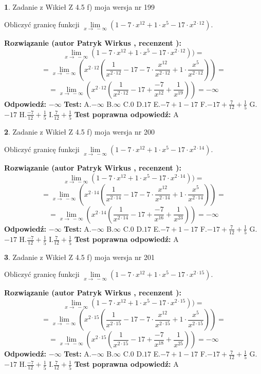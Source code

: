 \documentclass[12pt, a4paper]{article}
\theoremstyle{definition} %
\newtheorem{zad}{}
\newcommand{\zadStart}[1]{\begin{zad}#1\newline}
\newcommand{\zadStop}{\end{zad}}
\newcommand{\rozwStart}[2]{\noindent \textbf{Rozwiązanie (autor #1 , recenzent #2): }\newline}
\newcommand{\rozwStop}{\newline}
\newcommand{\odpStart}{\noindent \textbf{Odpowiedź:}\newline}
\newcommand{\odpStop}{\newline}
\newcommand{\testStart}{\noindent \textbf{Test:}\newline}
\newcommand{\testStop}{\newline}
\newcommand{\kluczStart}{\noindent \textbf{Test poprawna odpowiedź:}\newline}
\newcommand{\kluczStop}{\newline}
\begin{document}
\zadStart{Zadanie z Wikieł Z 4.5 f) moja wersja nr 199}



Obliczyć granicę funkcji  $\lim\limits_{x\to\ -\infty}(1 - 7 \cdot x^{12}+1 \cdot x^{5}- 17 \cdot x^{2\cdot12})$.
\zadStop
\rozwStart{Patryk Wirkus}{}
$$\lim\limits_{x\to\ -\infty}(1 - 7 \cdot x^{12}+1 \cdot x^{5}- 17 \cdot x^{2\cdot12}))=$$
$$=\lim\limits_{x\to\ -\infty}(x^{2\cdot12}(\frac{1}{x^{2\cdot12}}-17 -7 \cdot \frac{x^{12}}{x^{2\cdot12}}+1 \cdot \frac{x^{5}}{x^{2\cdot12}}))=$$
$$=\lim\limits_{x\to\ -\infty}(x^{2\cdot12}(\frac{1}{x^{2\cdot12}}-17 + \frac{-7}{x^{12}}+ \frac{1}{x^{19}}))=-\infty$$
\rozwStop
\odpStart
$-\infty$
\odpStop
\testStart
A.$-\infty$ B.$\infty$ C.$0$ D.$17$ E.$-7 + 1 - 17$
F.$-17+\frac{7}{12}+\frac{1}{5}$ G.$-17$
H.$\frac{-7}{12}+\frac{1}{5}$
I.$\frac{7}{12}+\frac{1}{5}$
\testStop
\kluczStart
A
\kluczStop



\zadStart{Zadanie z Wikieł Z 4.5 f) moja wersja nr 200}



Obliczyć granicę funkcji  $\lim\limits_{x\to\ -\infty}(1 - 7 \cdot x^{12}+1 \cdot x^{5}- 17 \cdot x^{2\cdot14})$.
\zadStop
\rozwStart{Patryk Wirkus}{}
$$\lim\limits_{x\to\ -\infty}(1 - 7 \cdot x^{12}+1 \cdot x^{5}- 17 \cdot x^{2\cdot14}))=$$
$$=\lim\limits_{x\to\ -\infty}(x^{2\cdot14}(\frac{1}{x^{2\cdot14}}-17 -7 \cdot \frac{x^{12}}{x^{2\cdot14}}+1 \cdot \frac{x^{5}}{x^{2\cdot14}}))=$$
$$=\lim\limits_{x\to\ -\infty}(x^{2\cdot14}(\frac{1}{x^{2\cdot14}}-17 + \frac{-7}{x^{16}}+ \frac{1}{x^{23}}))=-\infty$$
\rozwStop
\odpStart
$-\infty$
\odpStop
\testStart
A.$-\infty$ B.$\infty$ C.$0$ D.$17$ E.$-7 + 1 - 17$
F.$-17+\frac{7}{12}+\frac{1}{5}$ G.$-17$
H.$\frac{-7}{12}+\frac{1}{5}$
I.$\frac{7}{12}+\frac{1}{5}$
\testStop
\kluczStart
A
\kluczStop



\zadStart{Zadanie z Wikieł Z 4.5 f) moja wersja nr 201}



Obliczyć granicę funkcji  $\lim\limits_{x\to\ -\infty}(1 - 7 \cdot x^{12}+1 \cdot x^{5}- 17 \cdot x^{2\cdot15})$.
\zadStop
\rozwStart{Patryk Wirkus}{}
$$\lim\limits_{x\to\ -\infty}(1 - 7 \cdot x^{12}+1 \cdot x^{5}- 17 \cdot x^{2\cdot15}))=$$
$$=\lim\limits_{x\to\ -\infty}(x^{2\cdot15}(\frac{1}{x^{2\cdot15}}-17 -7 \cdot \frac{x^{12}}{x^{2\cdot15}}+1 \cdot \frac{x^{5}}{x^{2\cdot15}}))=$$
$$=\lim\limits_{x\to\ -\infty}(x^{2\cdot15}(\frac{1}{x^{2\cdot15}}-17 + \frac{-7}{x^{18}}+ \frac{1}{x^{25}}))=-\infty$$
\rozwStop
\odpStart
$-\infty$
\odpStop
\testStart
A.$-\infty$ B.$\infty$ C.$0$ D.$17$ E.$-7 + 1 - 17$
F.$-17+\frac{7}{12}+\frac{1}{5}$ G.$-17$
H.$\frac{-7}{12}+\frac{1}{5}$
I.$\frac{7}{12}+\frac{1}{5}$
\testStop
\kluczStart
A
\kluczStop
\end{document}
